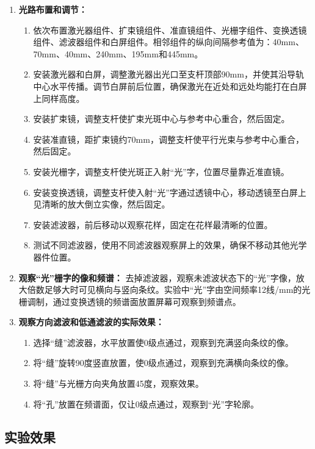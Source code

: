 \documentclass[zihao=5, UTF8]{article}
\theoremstyle{MyLineTheoremStyle} %
\theoremstyle{MyBlockTheoremStyle} %
\theoremstyle{MySubsubsectionStyle} %
\begin{document}
\begin{enumerate}
    \item \textbf{光路布置和调节：}
    \begin{enumerate}
        \item 依次布置激光器组件、扩束镜组件、准直镜组件、光栅字组件、变换透镜组件、滤波器组件和白屏组件。相邻组件的纵向间隔参考值为：40mm、70mm、40mm、240mm、195mm和445mm。
        \item 安装激光器和白屏，调整激光器出光口至支杆顶部90mm，并使其沿导轨中心水平传播。调节白屏前后位置，确保激光在近处和远处均能打在白屏上同样高度。
        \item 安装扩束镜，调整支杆使扩束光斑中心与参考中心重合，然后固定。
        \item 安装准直镜，距扩束镜约70mm，调整支杆使平行光束与参考中心重合，然后固定。
        \item 安装光栅字，调整支杆使光斑正入射“光”字，位置尽量靠近准直镜。
        \item 安装变换透镜，调整支杆使入射“光”字通过透镜中心，移动透镜至白屏上见清晰的放大倒立实像，然后固定。
        \item 安装滤波器，前后移动以观察花样，固定在花样最清晰的位置。
        \item 测试不同滤波器，使用不同滤波器观察屏上的效果，确保不移动其他光学器件位置。
    \end{enumerate}

    \item \textbf{观察“光”栅字的像和频谱：}
    去掉滤波器，观察未滤波状态下的“光”字像，放大倍数足够大时可见横向与竖向条纹。实验中“光”字由空间频率12线/mm的光栅调制，通过变换透镜的频谱面放置屏幕可观察到频谱点。

    \item \textbf{观察方向滤波和低通滤波的实际效果：}
    \begin{enumerate}
        \item 选择“缝”滤波器，水平放置使0级点通过，观察到充满竖向条纹的像。
        \item 将“缝”旋转90度竖直放置，使0级点通过，观察到充满横向条纹的像。
        \item 将“缝”与光栅方向夹角放置45度，观察效果。
        \item 将“孔”放置在频谱面，仅让0级点通过，观察到“光”字轮廓。
    \end{enumerate}
\end{enumerate}

\subsection{实验效果}
\end{document}

